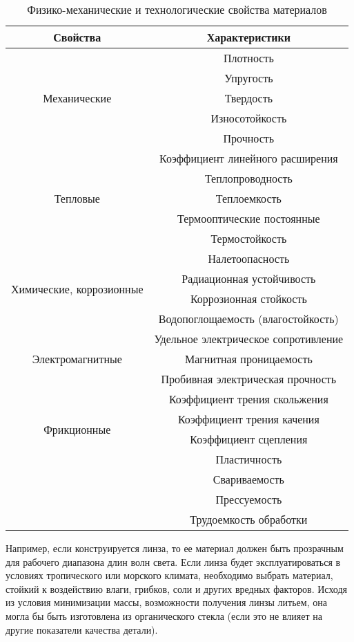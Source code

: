 \begin{table}[h]
	\caption{Физико-механические и технологические свойства материалов}
	\label{tab:prop}
	\begin{tabular}{|c|c|} \hline 
		Свойства & Характеристики \\ \hline
		\multirow{5}{*}{Механические} & Плотность\\ 
		& Упругость \\ 
		& Твердость \\
		& Износотойкость \\
		& Прочность\\ \hline
		\multirow{5}{*}{Тепловые} & Коэффициент линейного расширения\\
		& Теплопроводность \\
		& Теплоемкость \\
		& Термооптические постоянные \\
		& Термостойкость \\ \hline
        \multirow{4}{*}{Химические, коррозионные} & Налетоопасность \\
        & Радиационная устойчивость \\
        & Коррозионная стойкость \\
        & Водопоглощаемость (влагостойкость)\\ \hline
        \multirow{3}{*}{Электромагнитные} & Удельное электрическое сопротивление \\
        & Магнитная проницаемость \\
        & Пробивная электрическая прочность\\ \hline
        \multirow{4}{*}{Фрикционные} & Коэффициент трения скольжения \\
        & Коэффициент трения качения \\
        & Коэффициент сцепления \\ \hline
        \multirow{4}{*}{Технологические}  & Пластичность \\
        & Свариваемость \\
        & Прессуемость \\
        & Трудоемкость обработки \\ \hline
	\end{tabular}
\end{table}

Например, если конструируется линза, то ее материал должен быть прозрачным для рабочего диапазона длин волн света. Если линза будет эксплуатироваться в условиях тропического или морского климата, необходимо выбрать материал, стойкий к воздействию влаги, грибков, соли и других вредных факторов. Исходя из условия минимизации массы, возможности получения линзы литьем, она могла бы быть изготовлена из органического стекла (если это не влияет на другие показатели качества детали).

